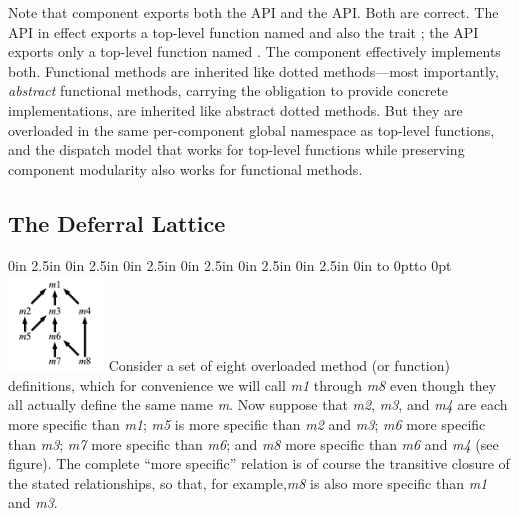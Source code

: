 Note that component
 exports both the
 API and the
 API.  Both are correct.
The  API
in effect exports a top-level function named
 and also the trait ;
the  API
exports only a top-level function named
.  The component effectively
implements both.  Functional methods are inherited
like dotted methods---most importantly,
\emph{abstract} functional methods,
carrying the obligation to
provide concrete implementations,
are inherited like abstract dotted methods.
But they are overloaded in the same per-component
global namespace as top-level functions,
and the dispatch model that works for top-level
functions while preserving component modularity
also works for functional methods.

\subsection{The Deferral Lattice}

\leavevmode{} 0in 2.5in 0in 2.5in 0in 2.5in 0in 2.5in 0in 2.5in 0in 2.5in 0in \hsize
\hbox to 0pt{\hskip 2.3in\vbox to 0pt{\vskip-10pt\includegraphics[width=1in,bb=0 0 228 228]{hierarchy-cropped.png}\vss}\hss}\relax
Consider a set of eight overloaded method (or function) definitions,
which for convenience we will call \emph{m1} through \emph{m8} even though
they all actually define the same name \emph{m}.  Now suppose that \emph{m2}, \emph{m3}, and \emph{m4}
are each more specific than \emph{m1};\emph{ m5} is more specific than \emph{m2} and \emph{m3};
\emph{m6} more specific than \emph{m3}; \emph{m7} more specific than \emph{m6};
and \emph{m8} more specific than \emph{m6} and \emph{m4} (see figure).
The complete ``more specific'' relation is of course the transitive closure
of the stated relationships, so that, for example,\emph{m8} is also more specific
than \emph{m1} and \emph{m3}.


